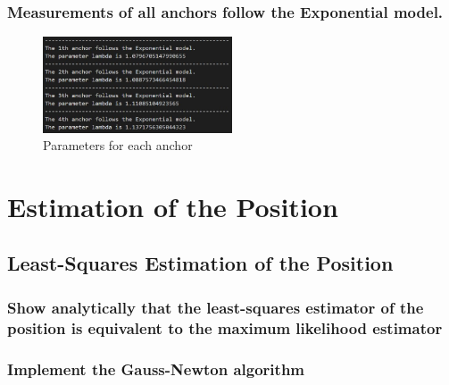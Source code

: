 \documentclass[a4paper]{article}
\begin{document}
\subsubsection{Measurements of all anchors follow the Exponential model.}
\begin{figure}[h]
	\begin{center}
		\includegraphics[width=0.5\textwidth]{scenario3param.jpg}
		\caption{Parameters for each anchor}
	\end{center}
\end{figure}

\section{Estimation of the Position}
\subsection{Least-Squares Estimation of the Position}
\subsubsection{Show analytically that the least-squares estimator of the position is equivalent to the maximum likelihood estimator}
\subsubsection{Implement the Gauss-Newton algorithm}
\end{document}
